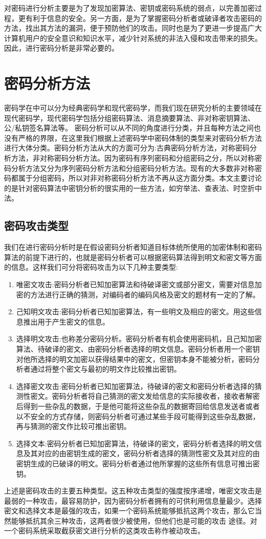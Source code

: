 对密码进行分析主要是为了发现加密算法、密钥或密码系统的弱点，以完善加密过程，更有利于信息的安全。另一方面，是为了掌握密码分析者或破译者攻击密码的方法，找出其方法的漏洞，便于预防他们的攻击。同时也是为了更进一步提高广大计算机用户的安全意识和知识水平，减少针对系统的非法入侵和攻击带来的损失。因此，进行密码分析是非常必要的。
\section{密码分析方法}
\label{sec:2.4}
密码学在\cite{feng02}中可以分为经典密码学和现代密码学，而我们现在研究分析的主要领域在现代密码学，现代密码学包括分组密码算法、消息摘要算法、非对称密钥算法、公/私钥签名算法等。
密码分析可以从不同的角度进行分类，并且每种方法之间也没有严格的界限，在这里我们根据上述密码学中密码体制的类型来对密码分析方法进行大体分类。密码分析方法从大的方面可分为:古典密码分析方法，对称密码分析方法，非对称密码分析方法。因为密码有序列密码和分组密码之分，所以对称密码分析方法又分为序列密码分析方法和分组密码分析方法。现有的大多数非对称密码都属于分组密码，所以对非对称密码分析方法不再从这方面分类。本文主要讨论的是针对密码算法中密钥分析的很实用的一些方法，如穷举法、查表法、时空折中法。
\subsection{密码攻击类型}
我们在进行密码分析时是在假设密码分析者知道目标体统所使用的加密体制和密码算法的前提下进行的，也就是密码分析者可以根据密码算法得到明文和密文等方面的信息。这样我们可分将密码攻击为以下几种主要类型:
\begin{enumerate}
\item 唯密文攻击:密码分析者已知加密算法和待破译密文或部分密文，需要对信息加密的方法进行正确的猜测，对编码者的编码风格及密文的题材有一定的了解。
\item 己知明文攻击:密码分析者已知加密算法，有一些明文及相应的密文。用这些信息推出用于产生密文的信息。
\item 选择明文攻击:也称差分密码分析。密码分析者有机会使用密码机，且己知加密算法、待破译的密文、由密码分析者选择的明文信息。密码分析者用一个密钥对他所选择的明文加密以获得结果中的密文，但密钥本身不能被分析，密码分析者通过将整个密文与最初的明文作比较推出密钥。
\item 选择密文攻击:密码分析者已知加密算法，待破译的密文和密码分析者选择的猜测性密文。密码分析者将自己猜测的密文发给信息的实际接收者，接收者解密后得到一些杂乱的数据，于是他可能将这些杂乱的数据寄回给信息发送者或者以不安全的方式存储，则密码分析者可通过某些手段可能得到这些杂乱数据，再与猜测的密文作比较可推出密钥。
\item 选择文本:密码分析者已知加密算法，待破译的密文，密码分析者选择的明文信息及其对应的由密钥生成的密文，密码分析者选择的猜测性密文及其对应的由密钥生成的已破译的明文。密码分析者通过他所掌握的这些所有信息可推出密钥。
\end{enumerate}
上述是密码攻击的主要五种类型。这五种攻击类型的强度按序递增，唯密文攻击是最弱的一种攻击，最容易防护，因为密码分析者拥有的可供利用信息量最少。选择密文和选择文本是最强的攻击，如果一个密码系统能够抵抗这两个攻击，那么它当然能够抵抗其余三种攻击，这两者很少被使用，但他们也是可能的攻击
途径。对一个密码系统采取截获密文进行分析的这类攻击称作被动攻击。

